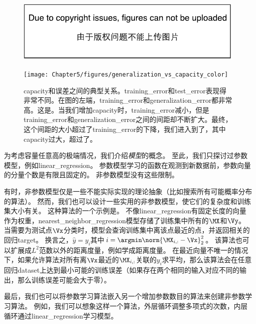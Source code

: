 \begin{figure}[!htb]
\ifOpenSource
\centerline{\includegraphics{figure.pdf}}
\else
\centerline{\texttt{[image: Chapter5/figures/generalization\_vs\_capacity\_color]}}
\fi
\caption{\gls{capacity}和误差之间的典型关系。\gls{training_error}和\gls{test_error}表现得非常不同。在图的左端，\gls{training_error}和\gls{generalization_error}都非常高。这是。当我们增加\gls{capacity}时，\gls{training_error}减小，但是\gls{training_error}和\gls{generalization_error}之间的间距却不断扩大。最终，这个间距的大小超过了\gls{training_error}的下降，我们进入到了，其中\gls{capacity}过大，超过了。}
\label{fig:chap5_generalization_vs_capacity}
\end{figure}


为考虑容量任意高的极端情况，我们介绍\emph{模型}的概念。
至此，我们只探讨过参数模型，例如\gls{linear_regression}。
参数模型学习的函数在观测到新数据前，参数向量的分量个数是有限且固定的。
非参数模型没有这些限制。

有时，非参数模型仅是一些不能实际实现的理论抽象（比如搜索所有可能概率分布的算法）。
然而，我们也可以设计一些实用的非参数模型，使它们的复杂度和训练集大小有关。
这种算法的一个示例是。
不像\gls{linear_regression}有固定长度的向量作为权重，\gls{nearest_neighbor_regression}模型存储了训练集中所有的$\MX$和$\Vy$。
当需要为测试点$\Vx$分类时，模型会查询训练集中离该点最近的点，并返回相关的回归\gls{target}。
换言之，$\hat{y}=y_i$其中$i=\argmin \norm{\MX_{i,:}-\Vx}_2^2$。
该算法也可以扩展成$L^2$范数以外的距离度量，例如学成距离度量\citep{RoweisNCA2005}。
在最近向量不唯一的情况下，如果允许算法对所有离$\Vx$最近的$\MX_{i,:}$关联的$y_i$求平均，那么该算法会在任意回归\gls{dataset}上达到最小可能的训练误差（如果存在两个相同的输入对应不同的输出，那么训练误差可能会大于零）。

最后，我们也可以将参数学习算法嵌入另一个增加参数数目的算法来创建非参数学习算法。
例如，我们可以想象这样一个算法，外层循环调整多项式的次数，内层循环通过\gls{linear_regression}学习模型。

